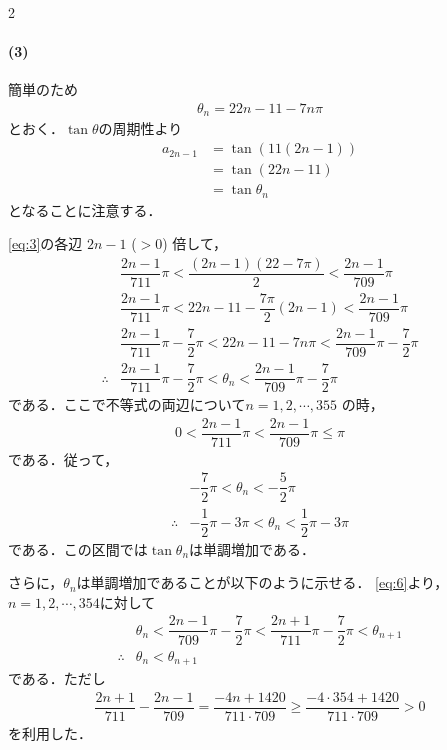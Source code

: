 \documentclass[../../main.tex]{subfiles}
\begin{document}
\begin{multicols}{2}
  \paragraph{(3)}
  簡単のため
  \begin{align}
    \theta_n = 22n-11-7n\pi
  \end{align}
  とおく．$\tan\theta$の周期性より
  \begin{align}
    a_{2n-1}
    & = \tan\left(11(2n-1)\right)        \\
    & = \tan\left(22n-11\right)          \\
    & = \tan\theta_n \label{eq:5}
  \end{align}
  となることに注意する．

  \cref{eq:3}の各辺 $2n-1$ ($>0$) 倍して，
  \begin{align}
    & \dfrac{2n-1}{711}\pi < \dfrac{(2n-1)(22 - 7\pi)}{2} < \dfrac{2n-1}{709}\pi \nonumber \\
    & \dfrac{2n-1}{711}\pi < 22n-11 - \dfrac{7\pi}{2}(2n-1) < \dfrac{2n-1}{709}\pi \nonumber \\
    & \dfrac{2n-1}{711}\pi - \dfrac{7}{2}\pi < 22n-11 - 7n\pi < \dfrac{2n-1}{709}\pi - \dfrac{7}{2}\pi \nonumber \\
    \therefore
    & \dfrac{2n-1}{711}\pi - \dfrac{7}{2}\pi < \theta_n < \dfrac{2n-1}{709}\pi - \dfrac{7}{2}\pi \label{eq:6}
  \end{align}
  である．ここで不等式の両辺について$n=1,2,\cdots,355$ の時，
  \begin{align}
    0 < \dfrac{2n-1}{711}\pi < \dfrac{2n-1}{709}\pi \le \pi
  \end{align}
  である．従って，
  \begin{align}
    &  -\dfrac{7}{2}\pi<\theta_n<-\dfrac{5}{2}\pi \\
    \therefore
    & -\dfrac{1}{2}\pi-3\pi < \theta_n < \dfrac{1}{2}\pi - 3\pi
  \end{align}
  である．この区間では$\tan\theta_n$は単調増加である．

  さらに，$\theta_n$は単調増加であることが以下のように示せる．
  \cref{eq:6}より，$n=1,2,\cdots,354$に対して
  \begin{align}
    & \theta_n < \dfrac{2n-1}{709}\pi - \dfrac{7}{2}\pi < \dfrac{2n+1}{711}\pi - \dfrac{7}{2}\pi < \theta_{n+1} \nonumber \\
    \therefore
    & \theta_n < \theta_{n+1} \label{eq:7}
  \end{align}
  である．ただし
  \begin{align}
    \dfrac{2n+1}{711} - \dfrac{2n-1}{709} = \dfrac{-4n+1420}{711 \cdot 709} \ge \dfrac{-4\cdot 354+1420}{711 \cdot 709} > 0
  \end{align}
  を利用した．


\end{multicols}
\end{document}
